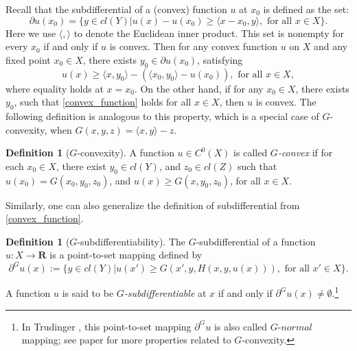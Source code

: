 \documentclass[a4paper, 11pt]{amsart}
\numberwithin{equation}{section}
\theoremstyle{plain}
\theoremstyle{definition}
\newtheorem{definition}[theorem]{Definition}
\theoremstyle{remark}
\newcommand{\R}{\mathbf{R}}
\begin{document}
{Recall that the subdifferential of a (convex) function $u$ at $x_0$ is defined as the set:
\begin{equation*}
	\partial u(x_0) = \{ y \in cl(Y)| u(x) - u(x_0) \ge \langle  x- x_0,  y \rangle, \text{ for all } x \in X  \}.
\end{equation*}
Here we use $ \langle , \rangle$ to denote the Euclidean inner product. This set is nonempty for every $x_0$ if and only if $u$ is convex.} Then for any convex function $u$ on $X$ and any fixed point $x_0 \in X$, there exists $y_0 \in \partial u(x_0)$, satisfying%
\begin{equation}\label{convex_function}
u(x) \ge  \langle x , y_0\rangle -( \langle x_0, y_0\rangle -  u(x_0)),	\text{  for all $x \in X$},
\end{equation} 
where equality holds at $x = x_0$. On the other hand, if for any $x_0\in X$, there exists $y_0$, such that \eqref{convex_function} holds for all $x\in X$, then $u$ is convex. The following definition is analogous to this property, which is a special case of $G$-convexity, when $G(x,y,z) = \langle x, y \rangle -z$.

\begin{definition}[$G$-convexity]
	A function $u\in C^0(X)$ is called {\it $G$-convex} if for each $x_0 \in X$, there exist $y_0 \in   cl(Y)$, and $z_0 \in  cl(Z)$ such that $u(x_0)=G(x_0, y_0, z_0)$, and $u(x)\ge G(x, y_0, z_0)$, for all $x\in X$.
\end{definition}

\begin{comment}
From the definition, we know if $u$ is a $G$-convex function, for any $x\in X$, there exist $y\in cl(Y)$ and $z \in cl(Z)$, such that
\begin{equation}\label{2}
u(x)= G(x, y, z),\ \ \   Du(x) = D_x G(x, y, z)
\end{equation}

Given $u(x), Du(x)$, one can solve $y, z$, according to Assumption 1. \medskip
\end{comment}

Similarly, one can also generalize the definition of subdifferential from \eqref{convex_function}.

\begin{definition}[$G$-subdifferentiability]
	The $G$-subdifferential of a 
	function $u: X \rightarrow \R$ is a point-to-set mapping defined by
	\begin{equation*}
	\partial^G u(x):= \{ y\in  cl(Y)| u(x')\ge G(x',y, H(x,y,u(x))), \text{ for all } x'\in X\}.
	\end{equation*}
	
	A function $u$ is said to be {\it $G$-subdifferentiable} at $x$ if and only if $\partial^G u(x) \neq \emptyset$.\footnote{In Trudinger \cite{Trudinger14}, this point-to-set mapping $\partial^G u$ is also called $G$-$normal$ mapping; see paper for more properties related to $G$-convexity.}
\end{definition}
\end{document}
